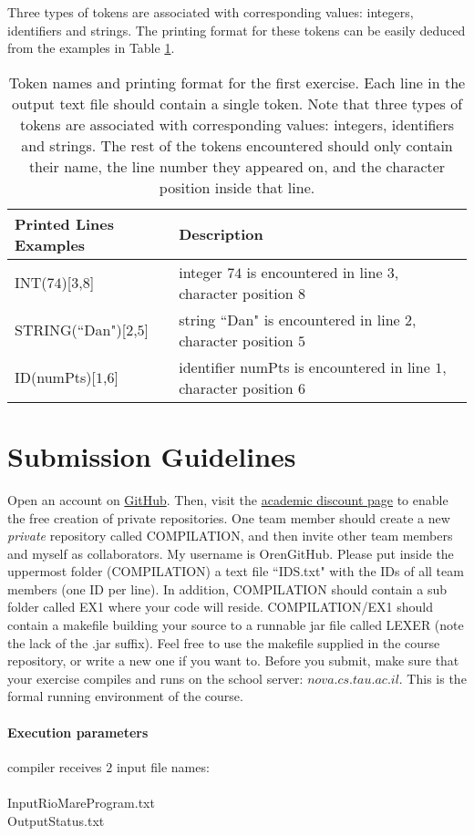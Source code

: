 \documentclass{article}
\begin{document}
Three types of tokens are associated with corresponding values: integers, identifiers and strings.
The printing format for these tokens can be easily deduced from the examples in Table \ref{Table_Token_Printing_Examples_For_Exercise_1}.
\begin{table}[h]
\centering
\begin{tabular}{|l|l| }
  Printed Lines Examples & Description \\
  \hline
  \hline
  INT($74$)[$3$,$8$] & integer $74$ is encountered in line $3$, character position $8$ \\
  \hline
  STRING(``Dan")[$2$,$5$] & string ``Dan" is encountered in line $2$, character position $5$ \\
  \hline
  ID(numPts)[$1$,$6$] & identifier numPts is encountered in line $1$, character position $6$ \\
  \hline
\end{tabular}
\caption{
Token names and printing format for the first exercise.
Each line in the output text file should contain a single token.
Note that three types of tokens are associated with corresponding values:
integers, identifiers and strings. The rest of the tokens encountered
should only contain their name,
the line number they appeared on, and the character position inside that line.
\label{Table_Token_Printing_Examples_For_Exercise_1}}
\end{table}

\section{Submission Guidelines}
Open an account on \href{https://github.com/}{GitHub}.
Then, visit the
\href{https://education.github.com/discount_requests/new}{academic discount page}
to enable the free creation of private repositories.
One team member should create a new \textit{private} repository called COMPILATION,
and then invite other team members and myself as collaborators.
My username is OrenGitHub.
Please put inside the uppermost folder (COMPILATION) a text file ``IDS.txt"
with the IDs of all team members (one ID per line).
In addition, COMPILATION should contain a sub folder called EX1
where your code will reside.
COMPILATION/EX1 should contain a makefile building your source to a
runnable jar file called LEXER (note the lack of the .jar suffix).
Feel free to use the makefile supplied in the course repository,
or write a new one if you want to. 
Before you submit, make sure that your exercise compiles and runs
on the school server: $nova.cs.tau.ac.il$.
This is the formal running environment of the course.
\paragraph{Execution parameters}
compiler receives $2$ input file names:\\ \\
InputRioMareProgram.txt\\
OutputStatus.txt
\end{document}
